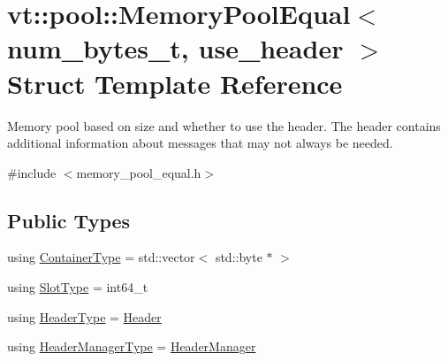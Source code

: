 \hypertarget{structvt_1_1pool_1_1_memory_pool_equal}{}\section{vt\+:\+:pool\+:\+:Memory\+Pool\+Equal$<$ num\+\_\+bytes\+\_\+t, use\+\_\+header $>$ Struct Template Reference}
\label{structvt_1_1pool_1_1_memory_pool_equal}


Memory pool based on size and whether to use the header. The header contains additional information about messages that may not always be needed.  




{\ttfamily \#include $<$memory\+\_\+pool\+\_\+equal.\+h$>$}

\subsection*{Public Types}
\begin{DoxyCompactItemize}
\item 
using \hyperlink{structvt_1_1pool_1_1_memory_pool_equal_a3f343f1f8f74e333c8fffad7698c85f1}{Container\+Type} = std\+::vector$<$ std\+::byte $\ast$ $>$
\item 
using \hyperlink{structvt_1_1pool_1_1_memory_pool_equal_af05a2c24c95c666b20e3758745be746b}{Slot\+Type} = int64\+\_\+t
\item 
using \hyperlink{structvt_1_1pool_1_1_memory_pool_equal_a26a1a8d38f35edec102a47d7b177bfb2}{Header\+Type} = \hyperlink{structvt_1_1pool_1_1_header}{Header}
\item 
using \hyperlink{structvt_1_1pool_1_1_memory_pool_equal_aede857d1f5e084ce6a25f9a499c74047}{Header\+Manager\+Type} = \hyperlink{structvt_1_1pool_1_1_header_manager}{Header\+Manager}
\end{DoxyCompactItemize}
